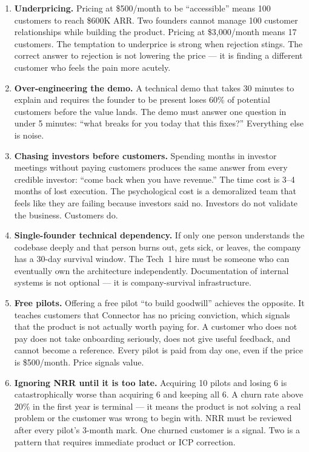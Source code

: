 \begin{enumerate}[leftmargin=1.8em, itemsep=6pt]
  \item \textbf{Underpricing.}\;
    Pricing at \$500/month to be ``accessible'' means 100 customers to
    reach \$600K ARR. Two founders cannot manage 100 customer relationships
    while building the product. Pricing at \$3,000/month means 17 customers.
    The temptation to underprice is strong when rejection stings. The
    correct answer to rejection is not lowering the price --- it is finding
    a different customer who feels the pain more acutely.

  \item \textbf{Over-engineering the demo.}\;
    A technical demo that takes 30 minutes to explain and requires the
    founder to be present loses 60\% of potential customers before the
    value lands. The demo must answer one question in under 5 minutes:
    ``what breaks for you today that this fixes?'' Everything else is noise.

  \item \textbf{Chasing investors before customers.}\;
    Spending months in investor meetings without paying customers produces
    the same answer from every credible investor: ``come back when you have
    revenue.'' The time cost is 3--4 months of lost execution. The
    psychological cost is a demoralized team that feels like they are
    failing because investors said no. Investors do not validate the
    business. Customers do.

  \item \textbf{Single-founder technical dependency.}\;
    If only one person understands the codebase deeply and that person
    burns out, gets sick, or leaves, the company has a 30-day survival
    window. The Tech~1 hire must be someone who can eventually own the
    architecture independently. Documentation of internal systems is not
    optional --- it is company-survival infrastructure.

  \item \textbf{Free pilots.}\;
    Offering a free pilot ``to build goodwill'' achieves the opposite. It
    teaches customers that Connector has no pricing conviction, which signals
    that the product is not actually worth paying for. A customer who does
    not pay does not take onboarding seriously, does not give useful
    feedback, and cannot become a reference. Every pilot is paid from day
    one, even if the price is \$500/month. Price signals value.

  \item \textbf{Ignoring NRR until it is too late.}\;
    Acquiring 10 pilots and losing 6 is catastrophically worse than
    acquiring 6 and keeping all 6. A churn rate above 20\% in the first year
    is terminal --- it means the product is not solving a real problem or
    the customer was wrong to begin with. NRR must be reviewed after
    every pilot's 3-month mark. One churned customer is a signal. Two is
    a pattern that requires immediate product or ICP correction.

\end{enumerate}

